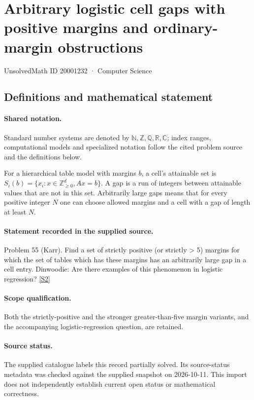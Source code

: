 \documentclass[11pt]{article}
\newcommand{\sref}[2]{\hyperlink{source:#1:#2}{[S#2]}}
\begin{document}
\setcounter{section}{20001231}
\section{Arbitrary logistic cell gaps with positive margins and ordinary-margin obstructions}\label{20001232}
{\small\sffamily UnsolvedMath ID 20001232 · Computer Science}
\subsection{Definitions and mathematical statement}

\paragraph{Shared notation.}Standard number systems are denoted by $\mathbb N,\mathbb Z,\mathbb Q,\mathbb R,\mathbb C$; index ranges, computational models and specialized notation follow the cited problem source and the definitions below.


For a hierarchical table model with margins $b$, a cell's attainable set is $S_i(b)=\{x_i:x\in\mathbb Z_{\ge0}^d,Ax=b\}$. A gap is a run of integers between attainable values that are not in this set. Arbitrarily large gaps means that for every positive integer $N$ one can choose allowed margins and a cell with a gap of length at least $N$.
\paragraph{Statement recorded in the supplied source.}
Problem 55 (Karr). Find a set of strictly positive (or strictly > 5) margins for which the set of tables which has these margins has an arbitrarily large gap in a cell entry. Dinwoodie: Are there examples of this phenomenon in logistic regression? \sref{20001232}{2}
\paragraph{Scope qualification.}
Both the strictly-positive and the stronger greater-than-five margin variants, and the accompanying logistic-regression question, are retained.
\paragraph{Source status.}
The supplied catalogue labels this record partially solved. Its source-status metadata was checked against the supplied snapshot on 2026-10-11. This import does not independently establish current open status or mathematical correctness.
\end{document}
